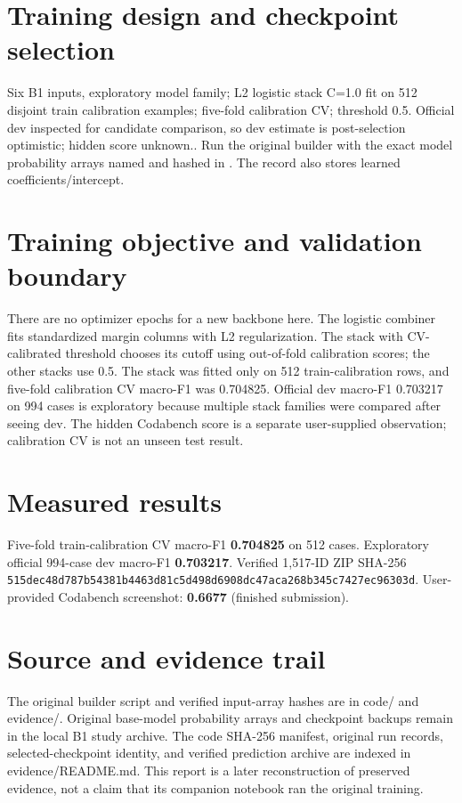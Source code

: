 \documentclass[11pt,a4paper]{article}
\begin{document}
\section{Training design and checkpoint selection}
Six B1 inputs, exploratory model family; L2 logistic stack C=1.0 fit on 512 disjoint train calibration examples; five-fold calibration CV; threshold 0.5. Official dev inspected for candidate comparison, so dev estimate is post-selection optimistic; hidden score unknown.. Run the original builder  with the exact model probability arrays named and hashed in . The record also stores learned coefficients/intercept.
\section{Training objective and validation boundary}
There are no optimizer epochs for a new backbone here. The logistic combiner fits standardized margin columns with L2 regularization. The stack with CV-calibrated threshold chooses its cutoff using out-of-fold calibration scores; the other stacks use 0.5. The stack was fitted only on 512 train-calibration rows, and five-fold calibration CV macro-F1 was 0.704825. Official dev macro-F1 0.703217 on 994 cases is exploratory because multiple stack families were compared after seeing dev. The hidden Codabench score is a separate user-supplied observation; calibration CV is not an unseen test result.
\begin{minipage}{\linewidth}
\section{Measured results}
Five-fold train-calibration CV macro-F1 \textbf{0.704825} on 512 cases. Exploratory official 994-case dev macro-F1 \textbf{0.703217}. Verified 1,517-ID ZIP SHA-256 \texttt{515dec48d787b543}\allowbreak\texttt{81b4463d81c5d498}\allowbreak\texttt{d6908dc47aca268b}\allowbreak\texttt{345c7427ec96303d}. User-provided Codabench screenshot: \textbf{0.6677} (finished submission).
\end{minipage}
\section{Source and evidence trail}
The original builder script and verified input-array hashes are in code/ and evidence/. Original base-model probability arrays and checkpoint backups remain in the local B1 study archive. The code SHA-256 manifest, original run records, selected-checkpoint identity, and verified prediction archive are indexed in evidence/README.md. This report is a later reconstruction of preserved evidence, not a claim that its companion notebook ran the original training.
\end{document}
